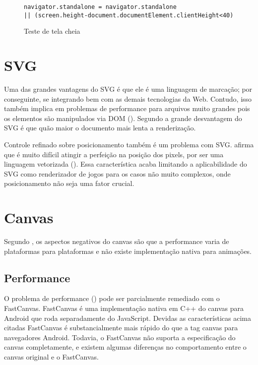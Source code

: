 \begin{figure}[H]
\centering
\begin{verbatim}
navigator.standalone = navigator.standalone 
|| (screen.height-document.documentElement.clientHeight<40)
\end{verbatim}
\caption{Teste de tela cheia}
\label{fig:fixJSTypes}
\end{figure}

\section{SVG}

Uma das grandes vantagens do SVG é que ele é uma linguagem de
marcação; por conseguinte, se integrando bem com as demais tecnologias
da Web. Contudo, isso também implica em problemas de performance para
arquivos muito grandes pois os elementos são manipulados via DOM
(). Segundo \citet{html5mostwanted} a
grande desvantagem do SVG é que quão maior o documento mais lenta a
renderização.

Controle refinado sobre posicionamento também é um problema com SVG.
\citet{html5mostwanted} afirma que é muito difícil atingir a
perfeição na posição dos pixels, por ser uma linguagem vetorizada
(). Essa característica acaba limitando
a aplicabilidade do SVG como renderizador de jogos para os casos não
muito complexos, onde posicionamento não seja uma fator crucial.

\section{Canvas}

Segundo \autocite{html5mostwanted}, os aspectos negativos do canvas são
que a performance varia de plataformas para plataformas e não existe
implementação nativa para animações.

\subsection{Performance}

O problema de performance () pode
ser parcialmente remediado com o FastCanvas. FastCanvas é uma
implementação nativa em C++ do canvas para Android que roda
separadamente do JavaScript. Devidas as características acima citadas
FastCanvas é substancialmente mais rápido do que a tag canvas para
navegadores Android. Todavia, o FastCanvas não suporta a
especificação do canvas completamente, e existem algumas diferenças no
comportamento entre o canvas original e o FastCanvas.

